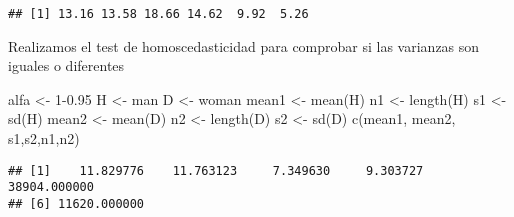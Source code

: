 \documentclass[
  a4paper]{article}
\newenvironment{Shaded}{\begin{snugshade}}{\end{snugshade}}
\newcommand{\CommentTok}[1]{\textcolor[rgb]{0.56,0.35,0.01}{\textit{#1}}}
\newcommand{\DecValTok}[1]{\textcolor[rgb]{0.00,0.00,0.81}{#1}}
\newcommand{\FloatTok}[1]{\textcolor[rgb]{0.00,0.00,0.81}{#1}}
\newcommand{\FunctionTok}[1]{\textcolor[rgb]{0.00,0.00,0.00}{#1}}
\newcommand{\NormalTok}[1]{#1}
\newcommand{\OtherTok}[1]{\textcolor[rgb]{0.56,0.35,0.01}{#1}}
\newcommand{\SpecialCharTok}[1]{\textcolor[rgb]{0.00,0.00,0.00}{#1}}
\newcommand{\StringTok}[1]{\textcolor[rgb]{0.31,0.60,0.02}{#1}}
\begin{document}
\begin{verbatim}
## [1] 13.16 13.58 18.66 14.62  9.92  5.26
\end{verbatim}

\begin{Shaded}
\end{Shaded}

Realizamos el test de homoscedasticidad para comprobar si las varianzas
son iguales o diferentes

\begin{Shaded}
\begin{Highlighting}[]
\NormalTok{alfa }\OtherTok{\textless{}{-}} \DecValTok{1}\FloatTok{{-}0.95}
\NormalTok{H }\OtherTok{\textless{}{-}}\NormalTok{ man}
\NormalTok{D }\OtherTok{\textless{}{-}}\NormalTok{ woman}
\NormalTok{mean1 }\OtherTok{\textless{}{-}} \FunctionTok{mean}\NormalTok{(H)}
\NormalTok{n1 }\OtherTok{\textless{}{-}} \FunctionTok{length}\NormalTok{(H)}
\NormalTok{s1 }\OtherTok{\textless{}{-}} \FunctionTok{sd}\NormalTok{(H)}
\NormalTok{mean2 }\OtherTok{\textless{}{-}} \FunctionTok{mean}\NormalTok{(D)}
\NormalTok{n2 }\OtherTok{\textless{}{-}} \FunctionTok{length}\NormalTok{(D)}
\NormalTok{s2 }\OtherTok{\textless{}{-}} \FunctionTok{sd}\NormalTok{(D)}
\FunctionTok{c}\NormalTok{(mean1, mean2, s1,s2,n1,n2)}
\end{Highlighting}
\end{Shaded}

\begin{verbatim}
## [1]    11.829776    11.763123     7.349630     9.303727 38904.000000
## [6] 11620.000000
\end{verbatim}
\end{document}
